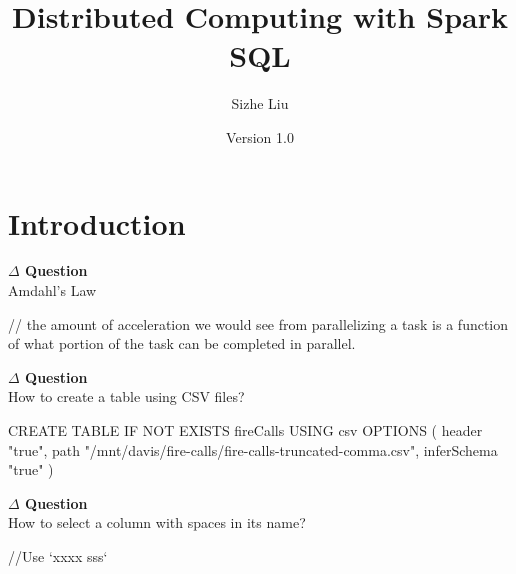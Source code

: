 \documentclass[12pt]{article}
\title{Distributed Computing with Spark SQL}
\author{Sizhe Liu}
\date{Version 1.0}
\newenvironment{que}
    { \begin{mdframed}[backgroundcolor=green!20] \textbf{$\Delta$ Question} \\}
    {  \end{mdframed}}
\begin{document}
\begin{titlingpage}
\maketitle
\end{titlingpage}

\newpage
\tableofcontents
\newpage
\section{Introduction}
\begin{que}
Amdahl's Law
\end{que}
\begin{code}
// the amount of acceleration we would see from parallelizing a task is a function of what portion of the task can be completed in parallel.
\end{code}

\begin{que}
How to create a table using CSV files?
\end{que}
\begin{code}
CREATE TABLE IF NOT EXISTS fireCalls
USING csv
OPTIONS (
  header "true",
  path "/mnt/davis/fire-calls/fire-calls-truncated-comma.csv",
  inferSchema "true"
)
\end{code}
\begin{que}
How to select a column with spaces in its name?
\end{que}
\begin{code}
//Use `xxxx sss`
\end{code}
\end{document}
